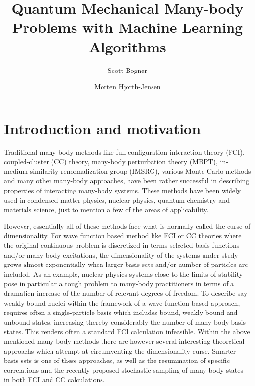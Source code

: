 \documentclass[aip,jcp,reprint,floatfix]{revtex4-1}
\begin{document}
\title{Quantum Mechanical Many-body Problems with Machine Learning Algorithms}


\author{Scott Bogner}

\author{Morten Hjorth-Jensen}


\maketitle

\section{Introduction and motivation}

Traditional many-body methods like full configuration interaction
theory (FCI), coupled-cluster (CC) theory, many-body perturbation theory (MBPT),
in-medium similarity renormalization group (IMSRG),
various Monte Carlo methods and many other many-body
approaches, have been rather successful in describing properties of
interacting many-body systems. These methods have been widely used in
condensed matter physics, nuclear physics, quantum chemistry and
materials science, just to mention a few of the areas of
applicability.

However, essentially all of these methods face what is
normally called the curse of dimensionality. For wave function based
method like FCI or CC theories where the original continuous problem
is discretized in terms selected basis functions and/or many-body
excitations, the dimensionality of the systems under study grows almost
exponentially when larger basis sets and/or number of particles are
included. As an example, nuclear physics 
systems close to the limits of stability pose in
particular a tough problem to many-body practitioners in terms of a dramaticn
increase of the number of relevant degrees of freedom. To describe say
weakly bound nuclei within the framework of a wave function based
approach, requires often a single-particle basis which includes bound,
weakly bound and unbound states, increasing thereby considerably the
number of many-body basis states. This renders often a standard
FCI calculation infeasible. Within the above mentioned
many-body methods there are however several interesting theoretical
approachs which attempt at circumventing the dimensionality
curse. Smarter basis sets is one of these approaches, as well as the
resummation of specific correlations and the recently proposed
stochastic sampling of many-body states in both FCI and CC
calculations.
\end{document}
